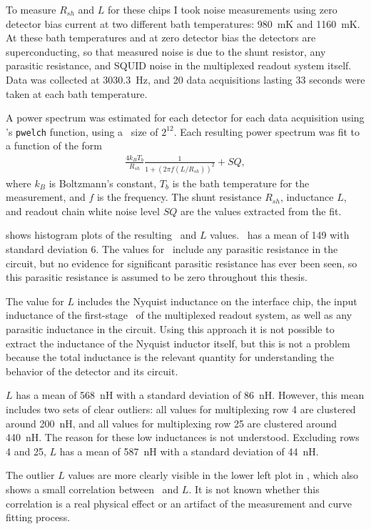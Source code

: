 To measure $R_{sh}$ and $L$ for these chips I took noise measurements using zero detector bias current at two different bath temperatures: 980~mK and 1160~mK.
At these bath temperatures and at zero detector bias the detectors are superconducting, so that measured noise is due to the shunt resistor, any parasitic resistance, and SQUID noise in the multiplexed readout system itself.
Data was collected at 3030.3~Hz, and 20 data acquisitions lasting 33 seconds were taken at each bath temperature.

A power spectrum was estimated for each detector for each data acquisition using \MATLAB's \texttt{pwelch} function, using a \FFT\ size of $2^{12}$.
Each resulting power spectrum was fit to a function of the form
\begin{eqnarray}\label{eqn:scnoise-fit}
	\frac{4 k_B T_b}{R_{sh}} \frac{1}{1 + (2 \pi f (L/R_{sh}))^2} + SQ,
\end{eqnarray}
where $k_B$ is Boltzmann's constant, $T_b$ is the bath temperature for the measurement, and $f$ is the frequency.
The shunt resistance $R_{sh}$, inductance $L$, and readout chain white noise level $SQ$ are the values extracted from the fit.

 shows histogram plots of the resulting \Rsh\ and $L$ values.
\Rsh\ has a mean of \SI{149}{\uohm} with standard deviation \SI{6}{\uohm}.
The values for \Rsh\ include any parasitic resistance in the circuit, but no evidence for significant parasitic resistance has ever been seen, so this parasitic resistance is assumed to be zero throughout this thesis.

The value for $L$ includes the Nyquist inductance on the interface chip, the input inductance of the first-stage \SQUID\ of the multiplexed readout system, as well as any parasitic inductance in the circuit.
Using this approach it is not possible to extract the inductance of the Nyquist inductor itself, but this is not a problem because the total inductance is the relevant  quantity for understanding the behavior of the detector and its circuit.

$L$ has a mean of 568~nH with a standard deviation of 86~nH.
However, this mean includes two sets of clear outliers: all values for multiplexing row 4 are clustered around 200~nH, and all values for multiplexing row 25 are clustered around 440~nH.
The reason for these low inductances is not understood.
Excluding rows 4 and 25,  $L$ has a mean of 587~nH with a standard deviation of 44~nH.

The outlier $L$ values are more clearly visible in the lower left plot in , which also shows a small correlation between \Rsh\ and $L$.
It is not known whether this correlation is a real physical effect or an artifact of the measurement and curve fitting process.

